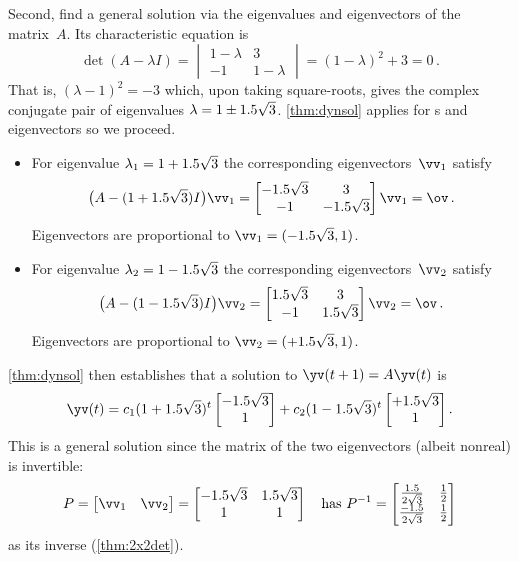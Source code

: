 \begin{example}
\begin{solution}
Second, find a general solution via the eigenvalues and eigenvectors of the matrix~\(A\).  
Its characteristic equation is 
\begin{equation*}
\det(A-\lambda I)=\begin{vmatrix} 1-\lambda&3\\-1&1-\lambda \end{vmatrix}
=(1-\lambda)^2+3=0\,.
\end{equation*}
That is, \((\lambda-1)^2=-3\) which, upon taking square-roots, gives the complex conjugate pair of eigenvalues \(\lambda=1\pm 1.5\sqrt3\).
\cref{thm:dynsol} applies for s and eigenvectors so we proceed.
\begin{itemize}
\item For eigenvalue \(\lambda_1=1+1.5\sqrt3\) the corresponding eigenvectors~\(\vv_1\) satisfy
\begin{equation*}
\big(A-(1+\i\sqrt3)I\big)\vv_1=\begin{bmatrix} -\i\sqrt3&3\\-1&-\i\sqrt3 \end{bmatrix}\vv_1=\ov\,.
\end{equation*}
Eigenvectors are proportional to \(\vv_1=(-\i\sqrt3,1)\).

\item For eigenvalue \(\lambda_2=1-1.5\sqrt3\) the corresponding eigenvectors~\(\vv_2\) satisfy
\begin{equation*}
\big(A-(1-\i\sqrt3)I\big)\vv_2=\begin{bmatrix} \i\sqrt3&3\\-1&\i\sqrt3 \end{bmatrix}\vv_2=\ov\,.
\end{equation*}
Eigenvectors are proportional to \(\vv_2=(+\i\sqrt3,1)\).
\end{itemize}
\cref{thm:dynsol} then establishes that a solution to \(\yv(t+1)=A\yv(t)\) is
\begin{equation*}
\yv(t)=c_1(1+\i\sqrt3)^t\begin{bmatrix} -\i\sqrt3\\1 \end{bmatrix}
+c_2(1-\i\sqrt3)^t\begin{bmatrix} +\i\sqrt3\\1 \end{bmatrix}.
\end{equation*}
This is a general solution since the matrix of the two eigenvectors (albeit nonreal) is invertible:
\begin{equation*}
P=\begin{bmatrix} \vv_1&\vv_2 \end{bmatrix}
=\begin{bmatrix} -\i\sqrt3&\i\sqrt3\\1&1 \end{bmatrix}
\quad\text{has }
P^{-1}=\begin{bmatrix} \frac \i{2\sqrt3}&\frac12\\\frac{-\i}{2\sqrt3}&\frac12 \end{bmatrix}
\end{equation*}
as its inverse (\cref{thm:2x2det}).


\end{solution}
\end{example}
